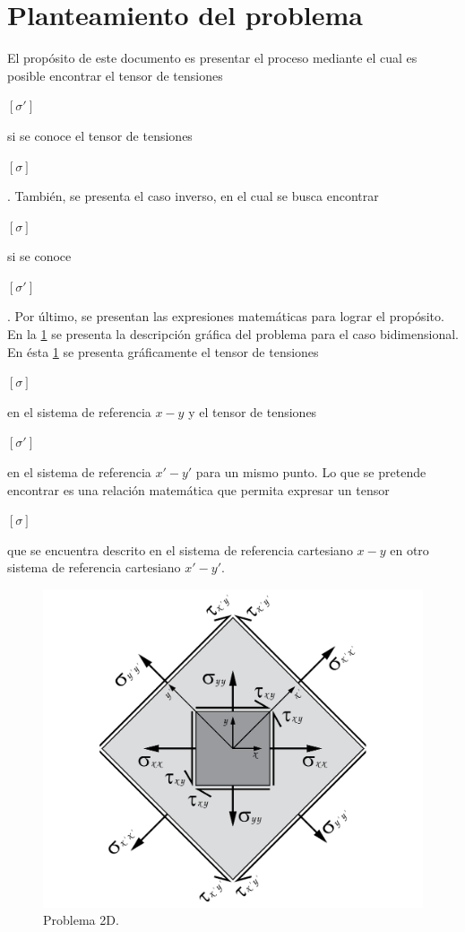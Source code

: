 \documentclass[12pt,letterpaper, twoside, openany]{article}
\begin{document}
\section{Planteamiento del problema}
%
El propósito de este documento es presentar el proceso mediante el cual es posible encontrar el tensor de tensiones \begin{large}$\left[ \sigma' \right]$\end{large} si se conoce el tensor de tensiones \begin{large}$\left[ \sigma \right]$\end{large}. También, se presenta el caso inverso, en el cual se busca encontrar \begin{large}$\left[ \sigma \right]$\end{large} si se conoce \begin{large}$\left[ \sigma' \right]$\end{large}. Por último, se presentan las expresiones matemáticas para lograr el propósito.
%
En la \cref{fig:planteamiento} se presenta la descripción gráfica del problema para el caso bidimensional. En ésta \cref{fig:planteamiento} se presenta gráficamente  el tensor de tensiones \begin{large}$\left[ \sigma \right]$\end{large} en el sistema de referencia $x-y$ y el tensor de tensiones \begin{large}$\left[ \sigma' \right]$\end{large} en el sistema de referencia $x'-y'$ para un mismo punto. Lo que se pretende encontrar es una relación matemática que permita  expresar un tensor  \begin{large}$\left[ \sigma \right]$\end{large} que se encuentra descrito en el sistema de referencia cartesiano $x-y$ en otro sistema de referencia cartesiano $x'-y'$. 
%
\begin{figure}[H]
	\centering
		\includegraphics[width=8 cm]{img/Planteamiento.pdf}
		\caption{Problema 2D.}
		\label{fig:planteamiento}
\end{figure}
%
\end{document}
